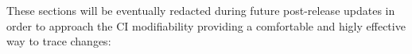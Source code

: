 These sections will be eventually redacted during future post-release updates in order to approach the CI modifiability providing a comfortable and higly effective way to trace changes:
